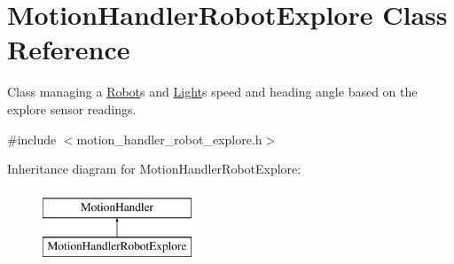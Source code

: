 \hypertarget{class_motion_handler_robot_explore}{}\section{Motion\+Handler\+Robot\+Explore Class Reference}
\label{class_motion_handler_robot_explore}


Class managing a \mbox{\hyperlink{class_robot}{Robot}}\textquotesingle{}s and \mbox{\hyperlink{class_light}{Light}}\textquotesingle{}s speed and heading angle based on the explore sensor readings.  




{\ttfamily \#include $<$motion\+\_\+handler\+\_\+robot\+\_\+explore.\+h$>$}

Inheritance diagram for Motion\+Handler\+Robot\+Explore\+:\begin{figure}[H]
\begin{center}
\leavevmode
\includegraphics[height=2.000000cm]{class_motion_handler_robot_explore}
\end{center}
\end{figure}
